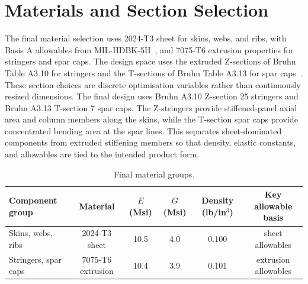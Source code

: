 \documentclass[11pt]{article}
\begin{document}
\section{Materials and Section Selection}

The final material selection uses 2024-T3 sheet for skins, webs, and ribs, with Basis A allowables from MIL-HDBK-5H~\cite{milhdbk5}, and 7075-T6 extrusion properties for stringers and spar caps. The design space uses the extruded Z-sections of Bruhn Table A3.10 for stringers and the T-sections of Bruhn Table A3.13 for spar caps~\cite{bruhn}. These section choices are discrete optimisation variables rather than continuously resized dimensions. The final design uses Bruhn A3.10 Z-section 25 stringers and Bruhn A3.13 T-section 7 spar caps. The Z-stringers provide stiffened-panel axial area and column members along the skins, while the T-section spar caps provide concentrated bending area at the spar lines. This separates sheet-dominated components from extruded stiffening members so that density, elastic constants, and allowables are tied to the intended product form.

\begin{table}[H]
\centering
\caption{Final material groups.}
\label{tab:materials}
\begin{tabular}{lccccc}
\toprule
Component group & Material & $E$ (Msi) & $G$ (Msi) & Density (lb/in$^3$) & Key allowable basis \\
\midrule
Skins, webs, ribs & 2024-T3 sheet & 10.5 & 4.0 & 0.100 & sheet allowables \\
Stringers, spar caps & 7075-T6 extrusion & 10.4 & 3.9 & 0.101 & extrusion allowables \\
\bottomrule
\end{tabular}
\end{table}

\begin{table}[H]
\centering
\caption{Selected stiffener and spar-cap section properties.}
\label{tab:selectedsections}
\scriptsize
{}
\end{table}
\end{document}
